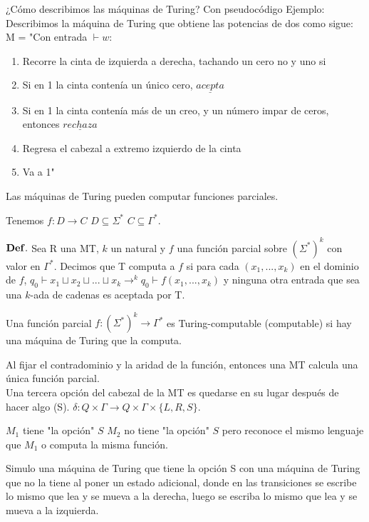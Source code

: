 \documentclass{homework}
\begin{document}
¿Cómo describimos las máquinas de Turing? Con pseudocódigo
Ejemplo:
Describimos la máquina de Turing que obtiene las potencias de dos como sigue:
M = "Con entrada $\vdash w$:
\begin{enumerate}
	\item Recorre la cinta de izquierda a derecha, tachando un cero no y uno si
	\item Si en 1 la cinta contenía un único cero, $\underline{acepta}$
	\item Si en 1 la cinta contenía más de un creo, y un número impar de ceros, entonces $\underline{rechaza}$
	\item Regresa el cabezal a extremo izquierdo de la cinta
	\item Va a 1"
\end{enumerate}

Las máquinas de Turing pueden computar funciones parciales.

Tenemos $f : D \rightarrow C$  $D \subseteq \Sigma^{*}$ $C \subseteq \Gamma^{*}$.

$\bf{Def.}$ Sea R una MT, $k$ un natural y $f$ una función parcial sobre $(\Sigma^{*})^{k}$ con valor en $\Gamma^{*}$. Decimos que T computa a $f$ si para cada $(x_1, ..., x_k)$ en el dominio de $f$, 
$q_0 \vdash x_1 \sqcup x_2 \sqcup ... \sqcup x_k \rightarrow^{k} q_0 \vdash f(x_1, ..., x_k)$
y ninguna otra entrada que sea una $k$-ada de cadenas es aceptada por T. 

Una función parcial $f: (\Sigma^{*})^{k} \rightarrow \Gamma^{*}$ es Turing-computable (computable) si hay una máquina de Turing que la computa.

Al fijar el contradominio y la aridad de la función, entonces una MT calcula una única función parcial.\\

Una tercera opción del cabezal de la MT es quedarse en su lugar después de hacer algo (S). 
$\delta : Q \times \Gamma \rightarrow Q \times \Gamma \times \{L,R,S\}$.

$M_1$ tiene "la opción" $S$
$M_2$ no tiene "la opción" $S$ pero reconoce el mismo lenguaje que $M_1$ o computa la misma función.

Simulo una máquina de Turing que tiene la opción S con una máquina de Turing que no la tiene al poner un estado adicional, donde en las transiciones se escribe lo mismo que lea y se mueva a la derecha, luego se escriba lo mismo que lea y se mueva a la izquierda.\\
\end{document}
